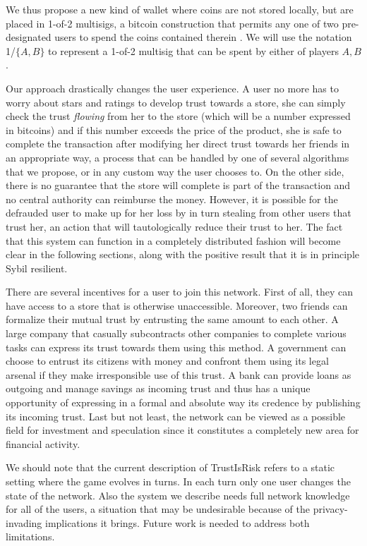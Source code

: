 \documentclass[11pt]{llncs}
\begin{document}
     We thus propose a new kind of wallet where coins are not stored locally, but are placed in 1-of-2 multisigs, a bitcoin
     construction that permits any one of two pre-designated users to spend the coins contained therein \cite{multisig}. We
     will use the notation 1/$\{A, B\}$ to represent a 1-of-2 multisig that can be spent by either of players $A, B$.

     Our approach drastically changes the user experience. A user no more has to worry about stars and ratings to develop
     trust towards a store, she can simply check the trust \textit{flowing} from her to the store (which will be a number
     expressed in bitcoins) and if this number exceeds the price of the product, she is safe to complete the transaction
     after modifying her direct trust towards her friends in an appropriate way, a process that can be handled by one of
     several algorithms that we propose, or in any custom way the user chooses to. On the other side, there is no guarantee
     that the store will complete is part of the transaction and no central authority can reimburse the money. However, it is
     possible for the defrauded user to make up for her loss by in turn stealing from other users that trust her, an action
     that will tautologically reduce their trust to her. The fact that this system can function in a completely distributed
     fashion will become clear in the following sections, along with the positive result that it is in principle Sybil
     resilient.

     There are several incentives for a user to join this network. First of all, they can have access to a store that is
     otherwise unaccessible. Moreover, two friends can formalize their mutual trust by entrusting the same amount to each
     other. A large company that casually subcontracts other companies to complete various tasks can express its trust
     towards them using this method. A government can choose to entrust its citizens with money and confront them using its
     legal arsenal if they make irresponsible use of this trust. A bank can provide loans as outgoing and manage savings as
     incoming trust and thus has a unique opportunity of expressing in a formal and absolute way its credence by publishing
     its incoming trust. Last but not least, the network can be viewed as a possible field for investment and speculation
     since it constitutes a completely new area for financial activity.

     We should note that the current description of TrustIsRisk refers to a static setting where the game evolves in turns.
     In each turn only one user changes the state of the network. Also the system we describe needs full network knowledge
     for all of the users, a situation that may be undesirable because of the privacy-invading implications it brings.
     Future work is needed to address both limitations.
\end{document}
